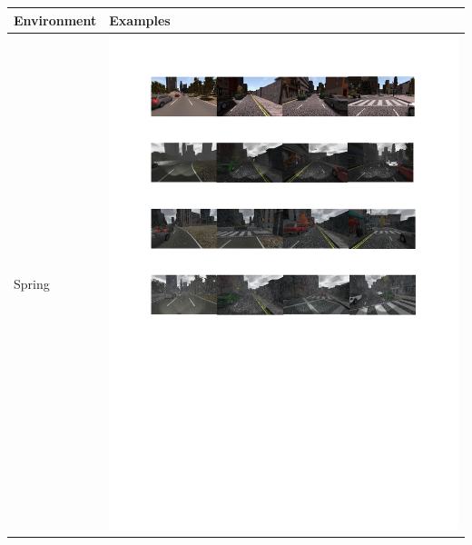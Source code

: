 \documentclass{svproc}
\begin{document}
	\begin{table}[!ht]
		\centering
		
		\begin{tabular}{|C{2.5cm}|C{8.5cm}|}
			\hline
			\textbf{Environment} & \textbf{Examples} \\ \hline
			Spring & \begin{minipage}{.9\textwidth}\includegraphics[scale=.5,trim=2cm 24.5cm 2cm 2.5cm,clip]{examples.pdf}\end{minipage} \\ \hline

\end{tabular}
\end{table}
\end{document}
